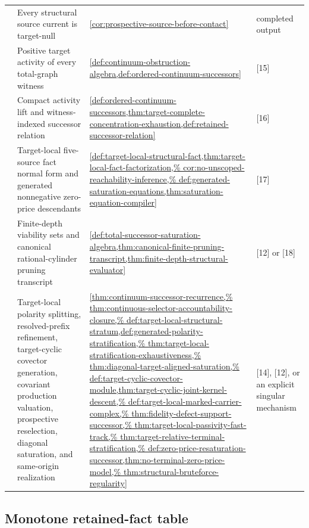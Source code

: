 \documentclass[11pt]{article}
\numberwithin{section}{part}
\theoremstyle{plain}
\theoremstyle{definition}
\theoremstyle{remark}
\begin{document}
\begin{longtable}{p{.055\linewidth}p{.28\linewidth}p{.42\linewidth}p{.12\linewidth}}
\relax
[13] & Every structural source current is target-null &
\cref{cor:prospective-source-before-contact} & completed output\\
\relax
[14] & Positive target activity of every total-graph witness &
\cref{def:continuum-obstruction-algebra,def:ordered-continuum-successors} & [15]\\
\relax
[15] & Compact activity lift and witness-indexed successor relation &
\cref{def:ordered-continuum-successors,thm:target-complete-concentration-exhaustion,def:retained-successor-relation} & [16]\\
\relax
[16] & Target-local five-source fact normal form and generated nonnegative
zero-price descendants &
\cref{def:target-local-structural-fact,thm:target-local-fact-factorization,%
cor:no-unscoped-reachability-inference,%
def:generated-saturation-equations,thm:saturation-equation-compiler} & [17]\\
\relax
[17] & Finite-depth viability sets and canonical rational-cylinder pruning
transcript &
\cref{def:total-successor-saturation-algebra,thm:canonical-finite-pruning-transcript,thm:finite-depth-structural-evaluator} & [12] or [18]\\
\relax
[18] & Target-local polarity splitting, resolved-prefix refinement,
target-cyclic covector generation, covariant production valuation,
prospective reselection, diagonal saturation, and same-origin
realization &
\cref{thm:continuum-successor-recurrence,%
thm:continuous-selector-accountability-closure,%
def:target-local-structural-stratum,def:generated-polarity-stratification,%
thm:target-local-stratification-exhaustiveness,%
thm:diagonal-target-aligned-saturation,%
def:target-cyclic-covector-module,thm:target-cyclic-joint-kernel-descent,%
def:target-local-marked-carrier-complex,%
thm:fidelity-defect-support-successor,%
thm:target-local-passivity-fast-track,%
thm:target-relative-terminal-stratification,%
def:zero-price-resaturation-successor,thm:no-terminal-zero-price-model,%
thm:structural-bruteforce-regularity} & [14], [12], or an explicit singular
mechanism\\
\bottomrule
\end{longtable}

\subsection*{Monotone retained-fact table}
\end{document}
